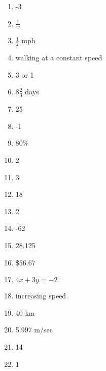\documentclass[../uilmath.tex]{subfiles}
\begin{document}
\begin{enumerate}[label=\bfseries\arabic*.]
    \item %
    -3 

    \item %
    $\frac{1}{w}$

    \item %
    $\frac{1}{2}$ mph 

    \item %
    walking at a constant speed 

    \item %
    3 or 1 

    \item %
    $8\frac{2}{3}$ days

    \item %
    25

    \item %
    -1

    \item %
    80\% 

    \item %
    2

    \item %
    3

    \item %
    18

    \item %
    2

    \item %
    -62

    \item %
    28.125 

    \item %
    \$56.67

    \item %
    $4x+3y=-2$

    \item %
    increasing speed 

    \item %
    40 km 

    \item %
    5.997 m/sec 

    \item %
    14

    \item %
    1


\end{enumerate}
\end{document}
